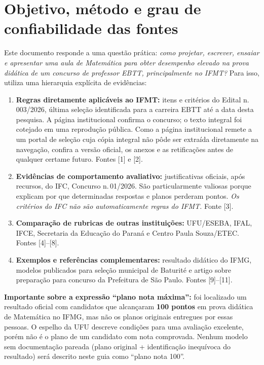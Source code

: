 \documentclass[11pt,a4paper]{article}
\newcommand{\ifc}{IFC, Concurso n.\,01/2026}
\begin{document}
\section{Objetivo, método e grau de confiabilidade das fontes}
Este documento responde a uma questão prática: \textit{como projetar, escrever, ensaiar e apresentar uma aula de Matemática para obter desempenho elevado na prova didática de um concurso de professor EBTT, principalmente no IFMT?} Para isso, utiliza uma hierarquia explícita de evidências:
\begin{enumerate}
\item \textbf{Regras diretamente aplicáveis ao IFMT:} itens e critérios do Edital n.\,003/2026, última seleção identificada para a carreira EBTT até a data desta pesquisa. A página institucional confirma o concurso; o texto integral foi cotejado em uma reprodução pública. Como a página institucional remete a um portal de seleção cuja cópia integral não pôde ser extraída diretamente na navegação, confira a versão oficial, os anexos e as retificações antes de qualquer certame futuro. Fontes [1] e [2].
\item \textbf{Evidências de comportamento avaliativo:} justificativas oficiais, após recursos, do \ifc. São particularmente valiosas porque explicam por que determinadas respostas e planos perderam pontos. \textit{Os critérios do IFC não são automaticamente regras do IFMT.} Fonte [3].
\item \textbf{Comparação de rubricas de outras instituições:} UFU/ESEBA, IFAL, IFCE, Secretaria da Educação do Paraná e Centro Paula Souza/ETEC. Fontes [4]--[8].
\item \textbf{Exemplos e referências complementares:} resultado didático do IFMG, modelos publicados para seleção municipal de Baturité e artigo sobre preparação para concurso da Prefeitura de São Paulo. Fontes [9]--[11].
\end{enumerate}

\begin{alerta}
\textbf{Importante sobre a expressão ``plano nota máxima'':} foi localizado um resultado oficial com candidatos que alcançaram \textbf{100 pontos} em prova didática de Matemática no IFMG, mas não os planos originais entregues por essas pessoas. O espelho da UFU descreve condições para uma avaliação excelente, porém não é o plano de um candidato com nota comprovada. Nenhum modelo sem documentação pareada (plano original + identificação inequívoca do resultado) será descrito neste guia como ``plano nota 100''.
\end{alerta}
\end{document}

